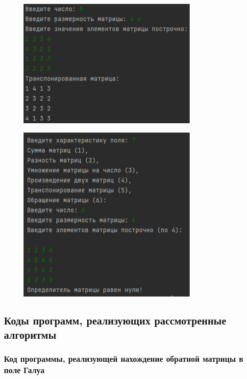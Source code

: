 \documentclass[bachelor, och, labwork]{shiza}
\begin{document}
        \begin{figure}[H]
            \centering
            \includegraphics[width=0.8\textwidth]{pic/12.png}
            \caption{}
        \end{figure}

        \begin{figure}[H]
            \centering
            \includegraphics[width=0.8\textwidth]{pic/13.png}
            \caption{}
        \end{figure}
        
    \subsection{Коды программ, реализующих рассмотренные алгоритмы}
        \subsubsection{Код программы, реализующей нахождение обратной матрицы в поле Галуа}
            \inputminted{python}{code/inverseMatrix.py}
\end{document}
